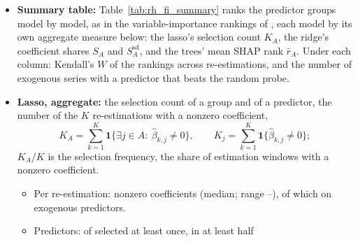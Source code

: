 \begin{itemize}
\begin{itemize}
    \rhfiNBuckets{} categories (Section~\ref{sec:rh_predictors}), the HAR components, the calendar dummies.
  \item Linear models: $\hat{\bm\beta}_k \in \mathbb{R}^p$, the coefficient estimates behind the forecast for $t_k$;
    $\hat{\bm\beta}_{k,A}$, its subvector on group $A$.
  \item Trees: SHAP values $\phi_{t,j}$ \citep{lundberg2017unified} and SHAP interaction values $\phi_{t,jl}$
    \citep{lundberg2020local}; they add up to the forecast,
    \[
      \hat y_t = \phi_0 + \sum_{j=1}^{p} \phi_{t,j}, \qquad
      \phi_{t,j} = \sum_{l=1}^{p} \phi_{t,jl}, \qquad
      \phi_{t,A} = \sum_{j \in A} \phi_{t,j}.
    \]
    For $j \ne l$, $\phi_{t,jl} = \tfrac12\bigl(\phi_{t,l} \mid j \text{ present} - \phi_{t,l} \mid j \text{ absent}\bigr)$,
    and $\phi_{t,jj} = \phi_{t,j} - \sum_{l \ne j} \phi_{t,jl}$.
  \item Path-dependent TreeSHAP \citep{lundberg2020local}: the training observations per node (node covers) stand in
    for the background sample.
  \item Number triples below: LightGBM, XGBoost, random forest.
  \end{itemize}
\item \textbf{Summary table:} Table~\ref{tab:rh_fi_summary} ranks the predictor groups model by model, as in the
  variable-importance rankings of \citet{gu2020empirical}, each model by its own aggregate measure below: the lasso's
  selection count $K_A$, the ridge's coefficient shares $S_A$ and $S^{\mathrm{sd}}_A$, and the trees' mean SHAP rank
  $\bar r_A$. Under each column: Kendall's $W$ of the rankings across re-estimations, and the number of exogenous
  series with a predictor that beats the random probe.

\item \textbf{Lasso, aggregate:} the selection count of a group and of a predictor, the number of the $K$
  re-estimations with a nonzero coefficient,
  \[
    K_A = \sum_{k=1}^{K} \mathbf{1}\bigl\{\exists j \in A:\ \hat\beta_{k,j} \ne 0\bigr\}, \qquad
    K_j = \sum_{k=1}^{K} \mathbf{1}\bigl\{\hat\beta_{k,j} \ne 0\bigr\};
  \]
  $K_A / K$ is the selection frequency, the share of estimation windows with a nonzero coefficient.
  \begin{itemize}
  \item Per re-estimation: \rhfiLassoNzMed{} nonzero coefficients (median; range \rhfiLassoNzMin--\rhfiLassoNzMax), of
    which \rhfiLassoExogNzMed{} on exogenous predictors.
  \item Predictors: \rhfiLassoColsEver{} of \rhfiP{} selected at least once, \rhfiLassoColsMajority{} in at least half

\end{itemize}
\end{itemize}
